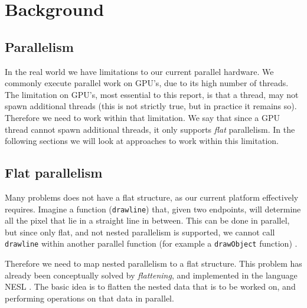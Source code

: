 \section{Background}
\label{BabyGotBack}
\begin{comment}
A common way to increase computer performance, is to increase the capacity for parallelism. For practical usage, however, this is difficult to implement, due to low-level GPU-specific languages requiring domain specific knowledge to make full use of that capacity. A vast amount of work has gone into transforming high-level hardware-agnostic code into these low-level GPU-specific languages \cite{inc-flat}. 
\end{comment}

\subsection{Parallelism} 
In the real world we have limitations to our current parallel hardware. We commonly execute parallel work on GPU's, due to its high number of threads. The limitation on GPU's, most essential to this report, is that a thread, may not spawn additional threads (this is not strictly true, but in practice it remains so). Therefore we need to work within that limitation. We say that since a GPU thread cannot spawn additional threads, it only supports \textit{flat} parallelism. In the following sections we will look at approaches to work within this limitation.    

\subsection{Flat parallelism}
Many problems does not have a flat structure, as our current platform effectively requires. Imagine a function (\texttt{drawline}) that, given two endpoints, will determine all the pixel that lie in a straight line in between. This can be done in parallel, but since only flat, and not nested parallelism is supported, we cannot call \texttt{drawline} within another parallel function (for example a \texttt{drawObject} function) \cite{flat}. 

Therefore we need to map nested parallelism to a flat structure. This problem has already been conceptually solved by \textit{flattening}, and implemented in the language NESL \cite{nesl}. The basic idea is to flatten the nested data that is to be worked on, and performing operations on that data in parallel. 

